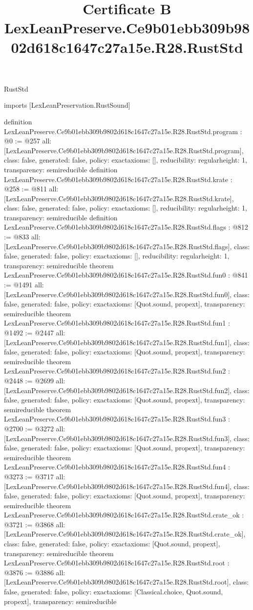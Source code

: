 \begin{lexlean}{RustStd}
\title{Certificate B LexLeanPreserve.Ce9b01ebb309b9802d618c1647c27a15e.R28.RustStd}
\begin{coremodule}
imports [LexLeanPreservation.RustSound]

definition LexLeanPreserve.Ce9b01ebb309b9802d618c1647c27a15e.R28.RustStd.program : @0 := @257 {
  all: [LexLeanPreserve.Ce9b01ebb309b9802d618c1647c27a15e.R28.RustStd.program],
  class: false,
  generated: false,
  policy: exact{axioms: []},
  reducibility: regular{height: 1},
  transparency: semireducible
}
definition LexLeanPreserve.Ce9b01ebb309b9802d618c1647c27a15e.R28.RustStd.krate : @258 := @811 {
  all: [LexLeanPreserve.Ce9b01ebb309b9802d618c1647c27a15e.R28.RustStd.krate],
  class: false,
  generated: false,
  policy: exact{axioms: []},
  reducibility: regular{height: 1},
  transparency: semireducible
}
definition LexLeanPreserve.Ce9b01ebb309b9802d618c1647c27a15e.R28.RustStd.flags : @812 := @833 {
  all: [LexLeanPreserve.Ce9b01ebb309b9802d618c1647c27a15e.R28.RustStd.flags],
  class: false,
  generated: false,
  policy: exact{axioms: []},
  reducibility: regular{height: 1},
  transparency: semireducible
}
theorem LexLeanPreserve.Ce9b01ebb309b9802d618c1647c27a15e.R28.RustStd.fun0 : @841 := @1491 {
  all: [LexLeanPreserve.Ce9b01ebb309b9802d618c1647c27a15e.R28.RustStd.fun0],
  class: false,
  generated: false,
  policy: exact{axioms: [Quot.sound, propext]},
  transparency: semireducible
}
theorem LexLeanPreserve.Ce9b01ebb309b9802d618c1647c27a15e.R28.RustStd.fun1 : @1492 := @2447 {
  all: [LexLeanPreserve.Ce9b01ebb309b9802d618c1647c27a15e.R28.RustStd.fun1],
  class: false,
  generated: false,
  policy: exact{axioms: [Quot.sound, propext]},
  transparency: semireducible
}
theorem LexLeanPreserve.Ce9b01ebb309b9802d618c1647c27a15e.R28.RustStd.fun2 : @2448 := @2699 {
  all: [LexLeanPreserve.Ce9b01ebb309b9802d618c1647c27a15e.R28.RustStd.fun2],
  class: false,
  generated: false,
  policy: exact{axioms: [Quot.sound, propext]},
  transparency: semireducible
}
theorem LexLeanPreserve.Ce9b01ebb309b9802d618c1647c27a15e.R28.RustStd.fun3 : @2700 := @3272 {
  all: [LexLeanPreserve.Ce9b01ebb309b9802d618c1647c27a15e.R28.RustStd.fun3],
  class: false,
  generated: false,
  policy: exact{axioms: [Quot.sound, propext]},
  transparency: semireducible
}
theorem LexLeanPreserve.Ce9b01ebb309b9802d618c1647c27a15e.R28.RustStd.fun4 : @3273 := @3717 {
  all: [LexLeanPreserve.Ce9b01ebb309b9802d618c1647c27a15e.R28.RustStd.fun4],
  class: false,
  generated: false,
  policy: exact{axioms: [Quot.sound, propext]},
  transparency: semireducible
}
theorem LexLeanPreserve.Ce9b01ebb309b9802d618c1647c27a15e.R28.RustStd.crate_ok : @3721 := @3868 {
  all: [LexLeanPreserve.Ce9b01ebb309b9802d618c1647c27a15e.R28.RustStd.crate_ok],
  class: false,
  generated: false,
  policy: exact{axioms: [Quot.sound, propext]},
  transparency: semireducible
}
theorem LexLeanPreserve.Ce9b01ebb309b9802d618c1647c27a15e.R28.RustStd.root : @3876 := @3886 {
  all: [LexLeanPreserve.Ce9b01ebb309b9802d618c1647c27a15e.R28.RustStd.root],
  class: false,
  generated: false,
  policy: exact{axioms: [Classical.choice, Quot.sound, propext]},
  transparency: semireducible
}


\end{coremodule}
\end{lexlean}
